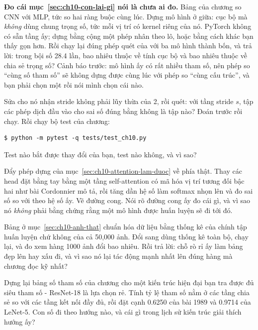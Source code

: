 \begin{bt}
  \item \textbf{Đo cái mục~\ref{sec:ch10-con-lai-gi} nói là chưa ai đo.} Bảng
    của chương so CNN với MLP, tức so hai ràng buộc cùng lúc. Dựng mô hình ở
    giữa: cục bộ mà \emph{không} dùng chung trọng số, tức mỗi vị trí có kernel
    riêng của nó. PyTorch không có sẵn tầng ấy; dựng bằng  cộng một
    phép nhân theo lô, hoặc bằng cách khác bạn thấy gọn hơn. Rồi chạy lại đúng
    phép quét của  với ba mô hình thành bốn, và trả lời:
    trong bội số 28.4 lần, bao nhiêu thuộc về tính cục bộ và bao nhiêu thuộc về
    chia sẻ trọng số? Cảnh báo trước: mô hình ấy có rất nhiều tham số, nên phép
    so \enquote{cùng số tham số} sẽ không dựng được cùng lúc với phép so
    \enquote{cùng cấu trúc}, và bạn phải chọn một rồi nói mình chọn cái nào.

  \item Sửa  cho nó nhận stride không phải lũy thừa
    của 2, rồi quét: với tầng stride \(s\), tập các phép dịch đầu vào cho sai
    số đúng bằng không là tập nào? Đoán trước rồi chạy. Rồi chạy bộ test của
    chương:

    \begin{verbatim}
$ python -m pytest -q tests/test_ch10.py
    \end{verbatim}

    Test nào bắt được thay đổi của bạn, test nào không, và vì sao?

  \item Đẩy phép dựng của mục~\ref{sec:ch10-attention-lam-duoc} về phía thật.
    Thay các head đặt bằng tay bằng một tầng self-attention có mã hóa vị trí
    tương đối bậc hai như bài Cordonnier mô tả, rồi tăng dần hệ số làm softmax
    nhọn lên và đo sai số so với  theo hệ số ấy. Vẽ đường cong.
    Nói rõ đường cong ấy đo cái gì, và vì sao nó \emph{không} phải bằng chứng
    rằng một mô hình được huấn luyện sẽ đi tới đó.

  \item Bảng ở mục~\ref{sec:ch10-anh-that} chuẩn hóa dữ liệu bằng thống kê của
    chính tập huấn luyện chứ không của cả 50,000 ảnh. Đổi sang dùng thống kê
    toàn bộ, chạy lại, và đo xem hàng 1000 ảnh đổi bao nhiêu. Rồi trả lời: chỗ
    rò rỉ ấy làm bảng đẹp lên hay xấu đi, và vì sao nó lại tác động mạnh nhất
    lên đúng hàng mà chương đọc kỹ nhất?

  \item Dựng lại bảng số tham số của chương cho một kiến trúc hiện đại bạn tra
    được đủ siêu tham số - ResNet-18 là lựa chọn rẻ. Tính tỷ lệ tham số nằm ở
    các tầng chia sẻ so với các tầng kết nối đầy đủ, rồi đặt cạnh 0.6250 của bài
    1989 và 0.9714 của LeNet-5. Con số đi theo hướng nào, và cái gì trong lịch
    sử kiến trúc giải thích hướng ấy?
\end{bt}

